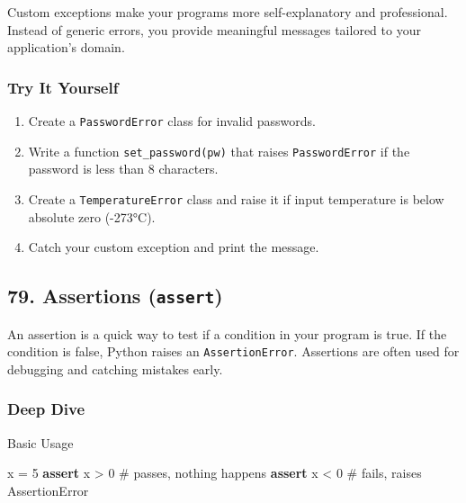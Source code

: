 \documentclass[
  letterpaper,
  DIV=11,
  numbers=noendperiod]{scrreprt}
\newenvironment{Shaded}{\begin{snugshade}}{\end{snugshade}}
\newcommand{\CommentTok}[1]{\textcolor[rgb]{0.37,0.37,0.37}{#1}}
\newcommand{\ControlFlowTok}[1]{\textcolor[rgb]{0.00,0.23,0.31}{\textbf{#1}}}
\newcommand{\DecValTok}[1]{\textcolor[rgb]{0.68,0.00,0.00}{#1}}
\newcommand{\NormalTok}[1]{\textcolor[rgb]{0.00,0.23,0.31}{#1}}
\newcommand{\OperatorTok}[1]{\textcolor[rgb]{0.37,0.37,0.37}{#1}}
\providecommand{\tightlist}{%
  \setlength{\itemsep}{0pt}\setlength{\parskip}{0pt}}
\begin{document}
Custom exceptions make your programs more self-explanatory and
professional. Instead of generic errors, you provide meaningful messages
tailored to your application's domain.

\subsubsection{Try It Yourself}\label{try-it-yourself-77}

\begin{enumerate}
\def\labelenumi{\arabic{enumi}.}
\tightlist
\item
  Create a \texttt{PasswordError} class for invalid passwords.
\item
  Write a function \texttt{set\_password(pw)} that raises
  \texttt{PasswordError} if the password is less than 8 characters.
\item
  Create a \texttt{TemperatureError} class and raise it if input
  temperature is below absolute zero (-273°C).
\item
  Catch your custom exception and print the message.
\end{enumerate}

\subsection{\texorpdfstring{79. Assertions
(\texttt{assert})}{79. Assertions (assert)}}\label{assertions-assert}

An assertion is a quick way to test if a condition in your program is
true. If the condition is false, Python raises an
\texttt{AssertionError}. Assertions are often used for debugging and
catching mistakes early.

\subsubsection{Deep Dive}\label{deep-dive-78}

Basic Usage

\begin{Shaded}
\begin{Highlighting}[]
\NormalTok{x }\OperatorTok{=} \DecValTok{5}
\ControlFlowTok{assert}\NormalTok{ x }\OperatorTok{\textgreater{}} \DecValTok{0}    \CommentTok{\# passes, nothing happens}
\ControlFlowTok{assert}\NormalTok{ x }\OperatorTok{\textless{}} \DecValTok{0}    \CommentTok{\# fails, raises AssertionError}
\end{Highlighting}
\end{Shaded}
\end{document}
